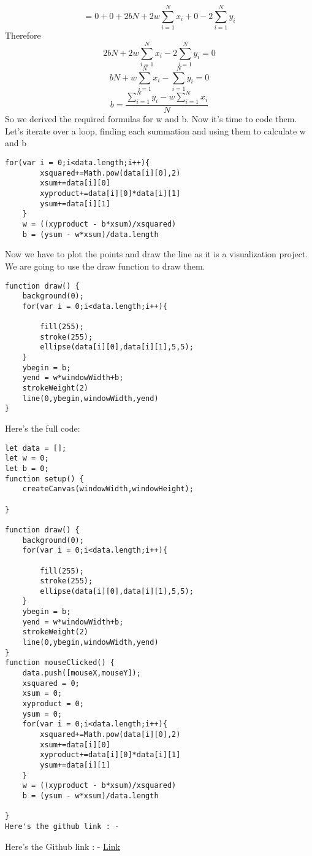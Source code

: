 \documentclass{article}
\begin{document}
\[ = 0+0+2bN+2w\sum_{i=1}^{N}x_{i}+0-2\sum_{i=1}^{N}y_{i}\]
Therefore
\[ 2bN+2w\sum_{i=1}^{N}x_{i}-2\sum_{i=1}^{N}y_{i} = 0\]
\[ bN+w\sum_{i=1}^{N}x_{i}-\sum_{i=1}^{N}y_{i} = 0\]
\[ b = \frac{\sum_{i=1}^{N}y_{i}-w\sum_{i=1}^{N}x_{i}}{N}\]
So we derived the required formulas for w and b. Now it's time to code them. Let's iterate over a loop, finding each summation and using them to calculate w and b
\begin{verbatim}
for(var i = 0;i<data.length;i++){
		xsquared+=Math.pow(data[i][0],2)
		xsum+=data[i][0]
		xyproduct+=data[i][0]*data[i][1]
		ysum+=data[i][1]
	}
	w = ((xyproduct - b*xsum)/xsquared)
	b = (ysum - w*xsum)/data.length
\end{verbatim}
Now we have to plot the points and draw the line as it is a visualization project. We are going to use the draw function to draw them.
\begin{verbatim}
function draw() {
	background(0);
	for(var i = 0;i<data.length;i++){
		
		fill(255);
		stroke(255);
		ellipse(data[i][0],data[i][1],5,5);
	}
	ybegin = b;
	yend = w*windowWidth+b;
	strokeWeight(2)
	line(0,ybegin,windowWidth,yend)
}
\end{verbatim}
Here's the full code:
\begin{verbatim}
let data = [];
let w = 0;
let b = 0;
function setup() {
	createCanvas(windowWidth,windowHeight);
	
}

function draw() {
	background(0);
	for(var i = 0;i<data.length;i++){
		
		fill(255);
		stroke(255);
		ellipse(data[i][0],data[i][1],5,5);
	}
	ybegin = b;
	yend = w*windowWidth+b;
	strokeWeight(2)
	line(0,ybegin,windowWidth,yend)
}
function mouseClicked() {
	data.push([mouseX,mouseY]);
	xsquared = 0;
	xsum = 0;
	xyproduct = 0;
	ysum = 0;
	for(var i = 0;i<data.length;i++){
		xsquared+=Math.pow(data[i][0],2)
		xsum+=data[i][0]
		xyproduct+=data[i][0]*data[i][1]
		ysum+=data[i][1]
	}
	w = ((xyproduct - b*xsum)/xsquared)
	b = (ysum - w*xsum)/data.length
	
}
Here's the github link : - 
\end{verbatim}
Here's the Github link : - \href{https://github.com/The-CS-Student/VisualML/}{Link} 
\end{document}

